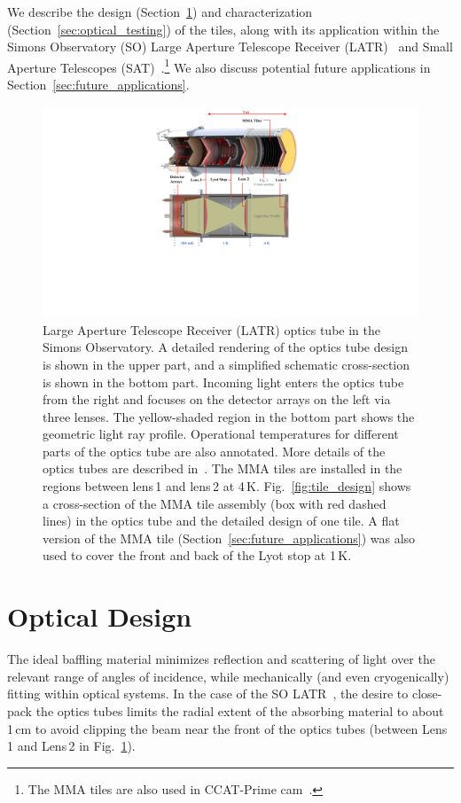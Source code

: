 We describe the design (Section~\ref{sec:optical_design}) and characterization (Section~\ref{sec:optical_testing}) of the tiles, along with its application within the Simons Observatory (SO) Large Aperture Telescope Receiver (LATR)~\cite{zhu18, orlo18} and Small Aperture Telescopes (SAT)~\cite{ali20}.\footnote{The MMA tiles are also used in CCAT-Prime cam~\cite{vavgiakis/etal:2018}.} We also discuss potential future applications in Section~\ref{sec:future_applications}.
\begin{figure}[H]
    \centering
    \includegraphics[width = .7\textwidth]{Figures/latr_ot.pdf}
    \caption{Large Aperture Telescope Receiver (LATR) optics tube in the Simons Observatory. A detailed rendering of the optics tube design is shown in the upper part, and a simplified schematic cross-section is shown in the bottom part. Incoming light enters the optics tube from the right and focuses on the detector arrays on the left via three lenses. The yellow-shaded region in the bottom part shows the geometric light ray profile. Operational temperatures for different parts of the optics tube are also annotated. More details of the optics tubes are described in~\cite{xu/etal:2020c}. The MMA tiles are installed in the regions between lens\,1 and lens\,2 at 4\,K. Fig.~\ref{fig:tile_design} shows a cross-section of the MMA tile assembly (box with red dashed lines) in the optics tube and the detailed design of one tile. A flat version of the MMA tile (Section~\ref{sec:future_applications}) was also used to cover the front and back of the Lyot stop at 1\,K.}
    \label{fig:latr_ot}
\end{figure}

\section{Optical Design}
\label{sec:optical_design}

The ideal baffling material minimizes reflection and scattering of light over the relevant range of angles of incidence, while mechanically (and even cryogenically) fitting within optical systems.  In the case of the SO LATR~\cite{xu/etal:2020c, zhu18, orlo18, coppi/etal:2018}, the desire to close-pack the optics tubes limits the radial extent of the absorbing material to about 1\,cm to avoid clipping the beam near the front of the optics tubes (between Lens\,1 and Lens\,2 in Fig.~\ref{fig:latr_ot}).

